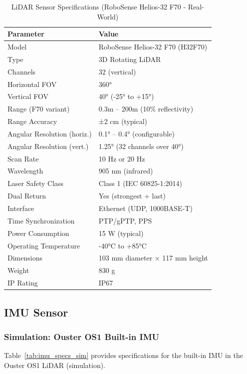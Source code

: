 \begin{table}[htbp]
\centering
\caption{LiDAR Sensor Specifications (RoboSense Helios-32 F70 - Real-World)}
\label{tab:lidar_specs_real}
\begin{tabular}{@{}ll@{}}
\toprule
\textbf{Parameter} & \textbf{Value} \\
\midrule
Model & RoboSense Helios-32 F70 (H32F70) \\
Type & 3D Rotating LiDAR \\
Channels & 32 (vertical) \\
Horizontal FOV & 360° \\
Vertical FOV & 40° (-25° to +15°) \\
Range (F70 variant) & 0.3m -- 200m (10\% reflectivity) \\
Range Accuracy & ±2 cm (typical) \\
Angular Resolution (horiz.) & 0.1° -- 0.4° (configurable) \\
Angular Resolution (vert.) & 1.25° (32 channels over 40°) \\
Scan Rate & 10 Hz or 20 Hz \\
Wavelength & 905 nm (infrared) \\
Laser Safety Class & Class 1 (IEC 60825-1:2014) \\
Dual Return & Yes (strongest + last) \\
Interface & Ethernet (UDP, 1000BASE-T) \\
Time Synchronization & PTP/gPTP, PPS \\
Power Consumption & 15 W (typical) \\
Operating Temperature & -40°C to +85°C \\
Dimensions & 103 mm diameter × 117 mm height \\
Weight & 830 g \\
IP Rating & IP67 \\
\bottomrule
\end{tabular}
\end{table}

\subsection{IMU Sensor}

\subsubsection{Simulation: Ouster OS1 Built-in IMU}

Table~\ref{tab:imu_specs_sim} provides specifications for the built-in IMU in the Ouster OS1 LiDAR (simulation).

